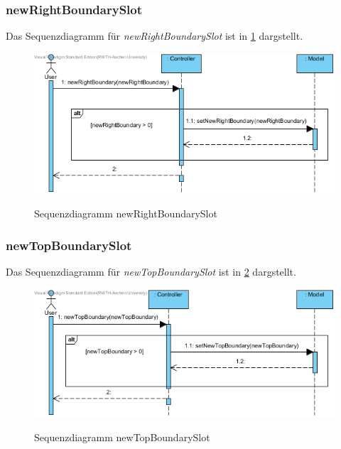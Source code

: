 \subsubsection*{newRightBoundarySlot}

Das Sequenzdiagramm für \emph{newRightBoundarySlot} ist in \ref{Sequenzdiagramm newRightBoundarySlot} dargstellt.

\begin{figure}[H]
	\centering
	\includegraphics[scale=.6]{Bilder/Controller__newRightBoundarySlot().jpg}\\
	\caption{Sequenzdiagramm newRightBoundarySlot}
	\label{Sequenzdiagramm newRightBoundarySlot}
\end{figure}

\subsubsection*{newTopBoundarySlot}

Das Sequenzdiagramm für \emph{newTopBoundarySlot} ist in \ref{Sequenzdiagramm newTopBoundarySlot} dargstellt.

\begin{figure}[H]
	\centering
	\includegraphics[scale=.6]{Bilder/Controller__newTopBoundarySlot().jpg}\\
	\caption{Sequenzdiagramm newTopBoundarySlot}
	\label{Sequenzdiagramm newTopBoundarySlot}
\end{figure}

